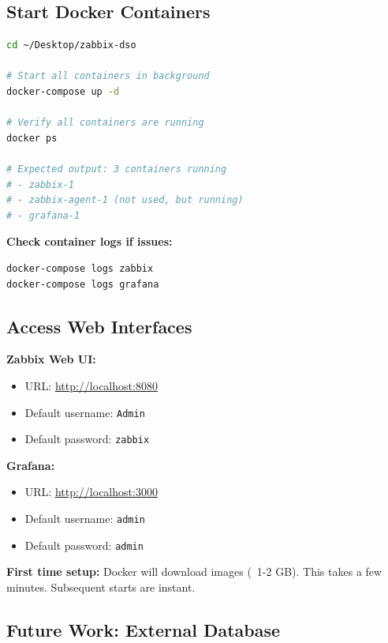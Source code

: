 \documentclass[12pt,a4paper]{report}
\begin{document}
\subsection{Start Docker Containers}

\begin{lstlisting}[language=bash]
cd ~/Desktop/zabbix-dso

# Start all containers in background
docker-compose up -d

# Verify all containers are running
docker ps

# Expected output: 3 containers running
# - zabbix-1
# - zabbix-agent-1 (not used, but running)
# - grafana-1
\end{lstlisting}

\textbf{Check container logs if issues:}
\begin{lstlisting}[language=bash]
docker-compose logs zabbix
docker-compose logs grafana
\end{lstlisting}

\subsection{Access Web Interfaces}

\textbf{Zabbix Web UI:}
\begin{itemize}
    \item URL: \url{http://localhost:8080}
    \item Default username: \texttt{Admin}
    \item Default password: \texttt{zabbix}
\end{itemize}

\textbf{Grafana:}
\begin{itemize}
    \item URL: \url{http://localhost:3000}
    \item Default username: \texttt{admin}
    \item Default password: \texttt{admin} 
\end{itemize}

\begin{important}
\textbf{First time setup:} Docker will download images (~1-2 GB). This takes a few minutes. Subsequent starts are instant.
\end{important}

\subsection{Future Work: External Database}
\end{document}
